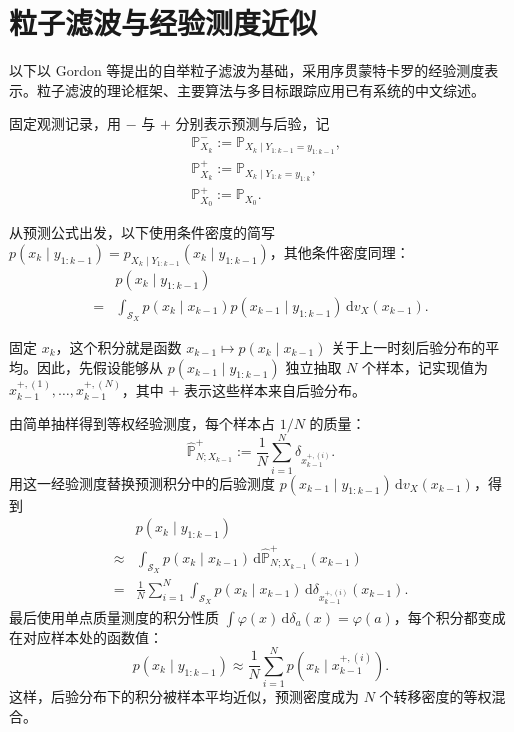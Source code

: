\section{粒子滤波与经验测度近似}\label{cw:sec:particle}

以下以 Gordon 等提出的自举粒子滤波为基础\cite{gordon1993novel}，采用序贯蒙特卡罗的经验测度表示\cite{doucet2001sequential}。粒子滤波的理论框架、主要算法与多目标跟踪应用已有系统的中文综述\cite{li2015particlezh}。

固定观测记录，用 $-$ 与 $+$ 分别表示预测与后验，记
\begin{equation}\label{cw:eq:5}
\begin{aligned}
&\mathbb{P}_{X_k}^-:=\mathbb{P}_{X_k\mid Y_{1:k-1}=y_{1:k-1}},\\
&\mathbb{P}_{X_k}^+:=\mathbb{P}_{X_k\mid Y_{1:k}=y_{1:k}},\\
&\mathbb{P}_{X_0}^+:=\mathbb{P}_{X_0}.
\end{aligned}
\end{equation}

从预测公式出发，以下使用条件密度的简写 $p(x_k\mid y_{1:k-1})=p_{X_k\mid Y_{1:k-1}}(x_k\mid y_{1:k-1})$，其他条件密度同理：
\begin{equation}\label{cw:eq:6}
\begin{aligned}
&p(x_k\mid y_{1:k-1})\\
= &\int_{\mathcal{S}_X}p(x_k\mid x_{k-1})p(x_{k-1}\mid y_{1:k-1})\,\mathrm{d}v_X(x_{k-1}).
\end{aligned}
\end{equation}

固定 $x_k$，这个积分就是函数 $x_{k-1}\mapsto p(x_k\mid x_{k-1})$ 关于上一时刻后验分布的平均。因此，先假设能够从 $p(x_{k-1}\mid y_{1:k-1})$ 独立抽取 $N$ 个样本，记实现值为 $x_{k-1}^{+,(1)},\dots,x_{k-1}^{+,(N)}$，其中 $+$ 表示这些样本来自后验分布。

由简单抽样得到等权经验测度，每个样本占 $1/N$ 的质量：
\begin{equation}\label{cw:eq:7}
\hat{\mathbb{P}}_{N;X_{k-1}}^+
:=\frac1N\sum_{i=1}^N\delta_{x_{k-1}^{+,(i)}}.
\end{equation}
用这一经验测度替换预测积分中的后验测度 $p(x_{k-1}\mid y_{1:k-1})\,\mathrm{d}v_X(x_{k-1})$，得到
\begin{equation}\label{cw:eq:8}
\begin{aligned}
&p(x_k\mid y_{1:k-1})\\
\approx &\int_{\mathcal{S}_X}p(x_k\mid x_{k-1})\,\mathrm{d}\hat{\mathbb{P}}_{N;X_{k-1}}^+(x_{k-1})\\
= &\frac1N\sum_{i=1}^N\int_{\mathcal{S}_X}p(x_k\mid x_{k-1})\,\mathrm{d}\delta_{x_{k-1}^{+,(i)}}(x_{k-1}).
\end{aligned}
\end{equation}
最后使用单点质量测度的积分性质 $\int\varphi(x)\,\mathrm{d}\delta_a(x)=\varphi(a)$，每个积分都变成在对应样本处的函数值：
\begin{equation}\label{cw:eq:9}
p(x_k\mid y_{1:k-1})\approx\frac1N\sum_{i=1}^N p(x_k\mid x_{k-1}^{+,(i)}).
\end{equation}
这样，后验分布下的积分被样本平均近似，预测密度成为 $N$ 个转移密度的等权混合。

